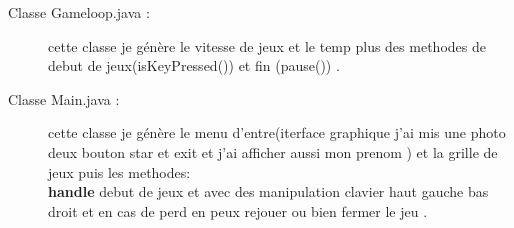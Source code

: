 \documentclass[a4paper]{report}
\begin{document}
\begin{onehalfspace} 
\begin{description}
\item[Classe Gameloop.java :\\] cette classe je génère le vitesse de jeux et le temp plus des methodes de debut de jeux(isKeyPressed()) et fin (pause()) . \\
\end{description}
\end{onehalfspace}


\begin{onehalfspace}
\begin{description}
\item[Classe Main.java :\\] cette classe je génère le menu d'entre(iterface graphique j'ai mis une photo deux bouton star et exit et j'ai afficher aussi mon prenom ) et la grille de jeux puis les methodes: \\
\textbf{handle} debut de jeux et avec des manipulation clavier haut gauche bas droit et en cas de perd en peux rejouer ou bien fermer le jeu . \\ 
\end{description}
\end{onehalfspace}
\end{document}
